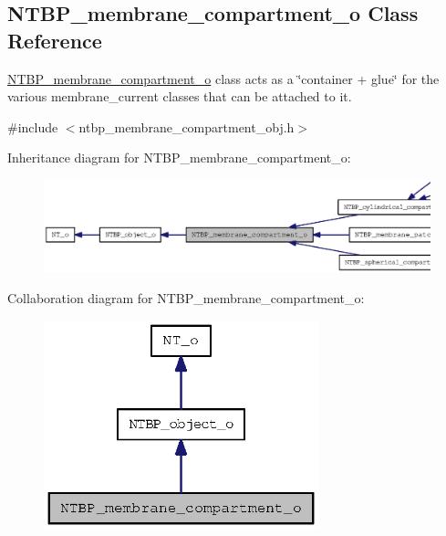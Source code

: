 \subsection{NTBP\_\-membrane\_\-compartment\_\-o Class Reference}
\label{class_n_t_b_p__membrane__compartment__o}


\hyperlink{class_n_t_b_p__membrane__compartment__o}{NTBP\_\-membrane\_\-compartment\_\-o} class acts as a \char`\"{}container + glue\char`\"{} for the various membrane\_\-current classes that can be attached to it.  




{\ttfamily \#include $<$ntbp\_\-membrane\_\-compartment\_\-obj.h$>$}



Inheritance diagram for NTBP\_\-membrane\_\-compartment\_\-o:
\nopagebreak
\begin{figure}[H]
\begin{center}
\leavevmode
\includegraphics[width=400pt]{class_n_t_b_p__membrane__compartment__o__inherit__graph}
\end{center}
\end{figure}


Collaboration diagram for NTBP\_\-membrane\_\-compartment\_\-o:
\nopagebreak
\begin{figure}[H]
\begin{center}
\leavevmode
\includegraphics[width=226pt]{class_n_t_b_p__membrane__compartment__o__coll__graph}
\end{center}
\end{figure}
